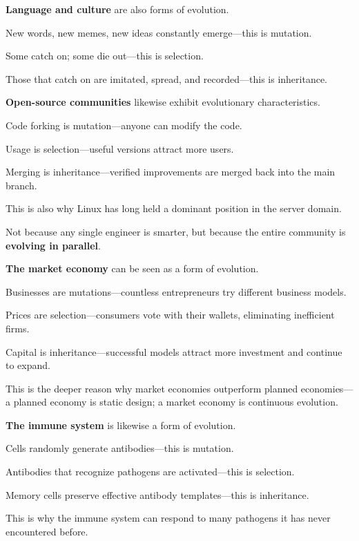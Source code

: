 \textbf{Language and culture} are also forms of evolution.

New words, new memes, new ideas constantly emerge---this is mutation.

Some catch on; some die out---this is selection.

Those that catch on are imitated, spread, and recorded---this is inheritance.

\vspace{1em}


\textbf{Open-source communities} likewise exhibit evolutionary characteristics.

Code forking is mutation---anyone can modify the code.

Usage is selection---useful versions attract more users.

Merging is inheritance---verified improvements are merged back into the main branch.

This is also why Linux has long held a dominant position in the server domain.

Not because any single engineer is smarter, but because the entire community is \textbf{evolving in parallel}.




\vspace{1em}

\textbf{The market economy} can be seen as a form of evolution.

Businesses are mutations---countless entrepreneurs try different business models.

Prices are selection---consumers vote with their wallets, eliminating inefficient firms.

Capital is inheritance---successful models attract more investment and continue to expand.

This is the deeper reason why market economies outperform planned economies---a planned economy is static design; a market economy is continuous evolution.

\vspace{1em}

\textbf{The immune system} is likewise a form of evolution.

Cells randomly generate antibodies---this is mutation.

Antibodies that recognize pathogens are activated---this is selection.

Memory cells preserve effective antibody templates---this is inheritance.

This is why the immune system can respond to many pathogens it has never encountered before.

